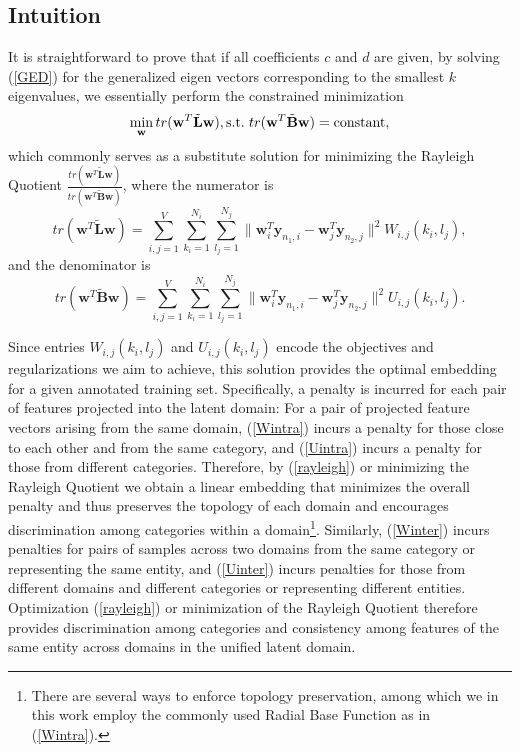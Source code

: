 \documentclass[10pt,twocolumn,letterpaper]{article}
\begin{document}
\subsection{Intuition}

It is straightforward to prove that if all coefficients $c$ and $d$ are given, by solving (\ref{GED}) for the generalized eigen vectors corresponding to the smallest $k$ eigenvalues, we essentially perform the constrained minimization 
\begin{equation}
\label{rayleigh}
\min_{\mathbf{w}}tr(\mathbf{w}^{T}\tilde{\mathbf{L}}\mathbf{w}), \textup{s.t.}\hspace{3pt}tr(\mathbf{w}^{T}\tilde{\mathbf{B}}\mathbf{w})=\textup{constant},
\end{equation} 
which commonly serves as a substitute solution for minimizing the Rayleigh Quotient $\frac{tr(\mathbf{w}^{T}\tilde{\mathbf{L}}\mathbf{w})}{tr(\mathbf{w}^{T}\tilde{\mathbf{B}}\mathbf{w})}$, where the numerator is
\begin{equation}
tr(\mathbf{w}^{T}\tilde{\mathbf{L}}\mathbf{w})=\sum_{i,j=1}^{V}\sum_{k_{i}=1}^{N_i}\sum_{l_{j}=1}^{N_j}\|\mathbf{w}_{i}^{T}\mathbf{y}_{n_{1},i}-\mathbf{w}_{j}^{T}\mathbf{y}_{n_{2},j}\|^{2}W_{i,j}(k_{i},l_{j}),
\end{equation}
and the denominator is
\begin{equation}
tr(\mathbf{w}^{T}\tilde{\mathbf{B}}\mathbf{w})=\sum_{i,j=1}^{V}\sum_{k_{i}=1}^{N_i}\sum_{l_{j}=1}^{N_j}\|\mathbf{w}_{i}^{T}\mathbf{y}_{n_{1},i}-\mathbf{w}_{j}^{T}\mathbf{y}_{n_{2},j}\|^{2}U_{i,j}(k_{i},l_{j}).
\end{equation}

Since entries $W_{i,j}(k_{i},l_{j})$ and $U_{i,j}(k_{i},l_{j})$  encode the objectives and regularizations we aim to achieve, this solution provides the optimal embedding for a given annotated training set. Specifically, a penalty is incurred for each pair of features projected into the latent domain: For a pair of projected feature vectors arising from the same domain, (\ref{Wintra}) incurs a penalty for those close to each other and from the same category, and (\ref{Uintra}) incurs a penalty for those from different categories. Therefore, by (\ref{rayleigh}) or minimizing the Rayleigh Quotient we obtain a linear embedding that minimizes the overall penalty and thus preserves the topology of each domain and encourages discrimination among categories within a domain\footnote{There are several ways to enforce topology preservation, among which we in this work employ the commonly used Radial Base Function as in (\ref{Wintra}).}. Similarly, (\ref{Winter}) incurs penalties for pairs of samples across two domains from the same category or representing the same entity, and (\ref{Uinter}) incurs penalties for those from different domains and different categories or representing different entities. Optimization (\ref{rayleigh}) or minimization of the Rayleigh Quotient therefore provides discrimination among categories and consistency among features of the same entity across domains in the unified latent domain.
\end{document}
